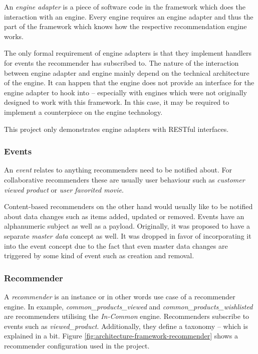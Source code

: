 An \emph{engine adapter} is a piece of software code in the framework which does the interaction with an engine. Every engine requires an engine adapter and thus the part of the framework which knows how the respective recommendation engine works.

The only formal requirement of engine adapters is that they implement handlers for events the recommender has subscribed to. The nature of the interaction between engine adapter and engine mainly depend on the technical architecture of the engine. It can happen that the engine does not provide an interface for the engine adapter to hook into -- especially with engines which were not originally designed to work with this framework. In this case, it may be required to implement a counterpiece on the engine technology.

This project only demonstrates engine adapters with RESTful interfaces.

\subsubsection{Events}

An \emph{event} relates to anything recommenders need to be notified about. For collaborative recommenders these are usually user behaviour such as \emph{customer viewed product} or \emph{user favorited movie}.

Content-based recommenders on the other hand would usually like to be notified about data changes such as items added, updated or removed. Events have an alphanumeric subject as well as a payload. Originally, it was proposed to have a separate \emph{master data} concept as well. It was dropped in favor of incorporating it into the event concept due to the fact that even master data changes are triggered by some kind of event such as creation and removal.

\subsubsection{Recommender}

A \emph{recommender} is an instance or in other words use case of a recommender engine. In example, \emph{common_products_viewed} and \emph{common_products_wishlisted} are recommenders utilising the \emph{In-Common} engine. Recommenders subscribe to events such as \emph{viewed_product}. Additionally, they define a taxonomy -- which is explained in a bit. Figure \ref{fig:architecture-framework-recommender} shows a recommender configuration used in the project.


